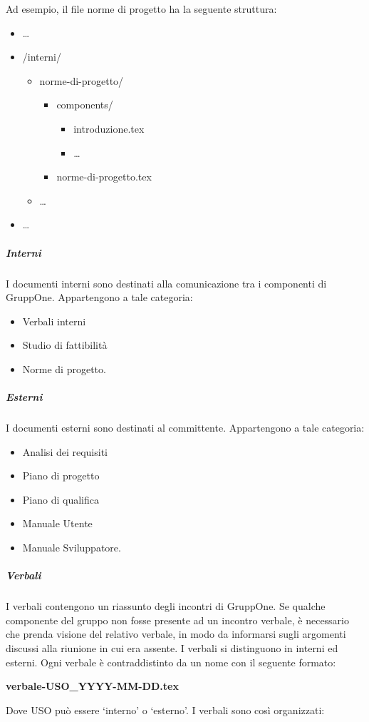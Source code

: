 \documentclass[../../norme-di-progetto.tex]{subfiles}
\begin{document}
Ad esempio, il file norme di progetto ha la seguente struttura:

\begin{itemize}
  \item[] \ldots
  \item[] /interni/
        \begin{itemize}
          \item[] norme-di-progetto/
                \begin{itemize}
                  \item[] components/
                        \begin{itemize}
                          \item[] introduzione.tex
                          \item[] \ldots
                        \end{itemize}
                  \item[] norme-di-progetto.tex
                \end{itemize}
          \item[] \ldots
        \end{itemize}
  \item[] \ldots
\end{itemize}

\subparagraph{Interni}%
\label{subp:suddivisione_dei_documenti/interni}
I documenti interni sono destinati alla comunicazione tra i componenti di GruppOne. Appartengono a tale categoria:

\begin{itemize}
  \item Verbali interni
  \item Studio di fattibilità
  \item Norme di progetto.
\end{itemize}

\subparagraph{Esterni}%
\label{subp:suddivisione_dei_documenti/esterni}
I documenti esterni sono destinati al committente. Appartengono a tale categoria:

\begin{itemize}
  \item Analisi dei requisiti
  \item Piano di progetto
  \item Piano di qualifica
  \item Manuale Utente
  \item Manuale Sviluppatore.
\end{itemize}

\subparagraph{Verbali}%
\label{subp:verbali}
I verbali contengono un riassunto degli incontri di GruppOne.
Se qualche componente del gruppo non fosse presente ad un incontro verbale, è necessario che prenda visione del relativo verbale, in modo da informarsi sugli argomenti discussi alla riunione in cui era assente.
I verbali si distinguono in interni ed esterni. Ogni verbale è contraddistinto da un nome con il seguente formato:
\begin{center}
  \textbf{verbale-USO\_YYYY-MM-DD.tex}
\end{center}
Dove USO può essere `interno' o `esterno'. I verbali sono così organizzati:
\end{document}
